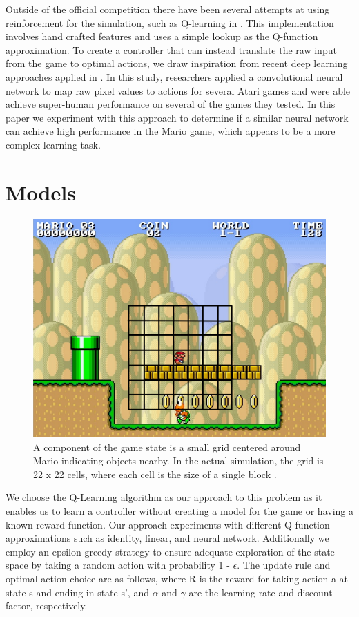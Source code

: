 \documentclass[12pt]{article}
\begin{document}
Outside of the official competition there have been several attempts at using reinforcement for the simulation, such as Q-learning in \cite{liao2012cs229}. This implementation involves hand crafted features and uses a simple lookup as the Q-function approximation. To create a controller that can instead translate the raw input from the game to optimal actions, we draw inspiration from recent deep learning approaches applied in \cite{mnih2013playing}. In this study, researchers applied a convolutional neural network to map raw pixel values to actions for several Atari games and were able achieve super-human performance on several of the games they tested. In this paper we experiment with this approach to determine if a similar neural network can achieve high performance in the Mario game, which appears to be a more complex learning task.

\section{Models}

\begin{figure}[h]
\centering
\includegraphics[scale=0.5]{imgs/mario_grid}
\caption{A component of the game state is a small grid centered around Mario indicating objects nearby. In the actual simulation, the grid is 22 x 22 cells, where each cell is the size of a single block \cite{karakovskiy2012mario}.}
\label{mario_grid}
\end{figure}

We choose the Q-Learning algorithm as our approach to this problem as it enables us to learn a controller without creating a model for the game or having a known reward function. Our approach experiments with different Q-function approximations such as identity, linear, and neural network. Additionally we employ an epsilon greedy strategy to ensure adequate exploration of the state space by taking a random action with probability 1 - $\epsilon$. The update rule and optimal action choice are as follows, where R is the reward for taking action a at state s and ending in state s', and $\alpha$ and $\gamma$ are the learning rate and discount factor, respectively.
\end{document}
